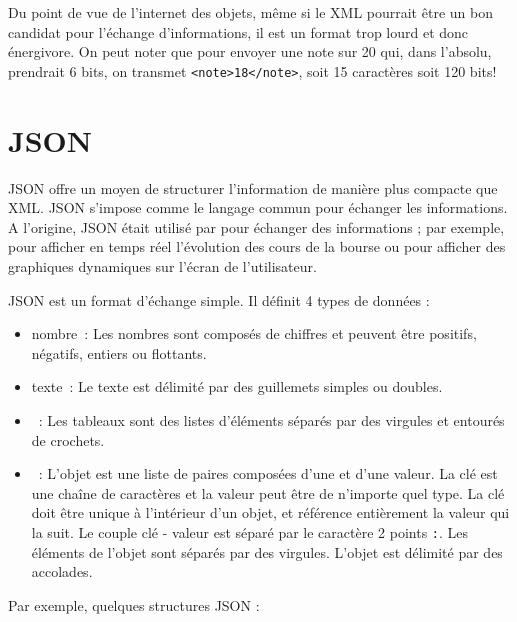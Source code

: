Du point de vue de l’internet des objets, même si le XML pourrait être un bon candidat pour l’échange d’informations, il est un format trop lourd et donc énergivore. On peut noter que pour envoyer une note sur 20 qui, dans l'absolu, prendrait 6 bits, on transmet \texttt{<note>18</note>}, soit 15 caractères soit 120 bits! 

\section{JSON}

\ac{JSON}  offre un moyen de structurer l’information de manière plus compacte que \ac{XML}. JSON s’impose comme le langage commun pour échanger les informations. A l’origine, JSON était utilisé par pour échanger des informations ; par exemple, pour afficher en temps réel l’évolution des cours de la bourse ou pour afficher des graphiques dynamiques sur l’écran de l’utilisateur.

JSON  est un format d’échange simple. Il définit 4 types de données :

\begin{itemize}
    \item nombre~: Les nombres sont composés de chiffres et peuvent être positifs, négatifs, entiers ou flottants.
    \item texte~: Le texte est délimité par des guillemets simples ou doubles.
    \item {}~: Les tableaux sont des listes d’éléments séparés par des virgules et entourés de crochets.
    \item {}~: L’objet est une liste de paires composées d’une  et d’une valeur. La clé est une chaîne de caractères et la valeur peut être de n’importe quel type. La clé doit être unique à l’intérieur d’un objet, et référence entièrement la valeur qui la suit. Le couple clé - valeur est séparé par le caractère 2 points  \texttt{:}. Les éléments de l’objet sont séparés par des virgules. L'objet est délimité par des accolades.
\end{itemize}

Par exemple, quelques structures \ac{JSON} :

